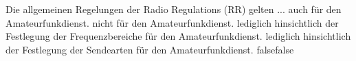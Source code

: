     {Die allgemeinen Regelungen der Radio Regulations (RR) gelten ...}
    {auch für den Amateurfunkdienst.}
    {nicht für den Amateurfunkdienst.}
    {lediglich hinsichtlich der Festlegung der Frequenzbereiche für den Amateurfunkdienst.}
    {lediglich hinsichtlich der Festlegung der Sendearten für den Amateurfunkdienst.}
    {false}{false}